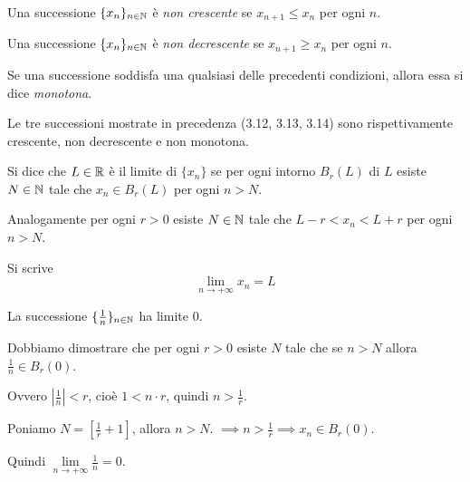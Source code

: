 \begin{definition}
Una successione $\{x_n\}_{n \in \mathbb N}$ è \emph{non crescente} se $x_{n+1} \le x_n$ per ogni $n$.
\end{definition}

\begin{definition}
Una successione $\{x_n\}_{n \in \mathbb N}$ è \emph{non decrescente} se $x_{n+1} \ge x_n$ per ogni $n$.
\end{definition}

Se una successione soddisfa una qualsiasi delle precedenti condizioni, allora essa si dice \emph{monotona}.

\begin{example}
Le tre successioni mostrate in precedenza (3.12, 3.13, 3.14) sono rispettivamente crescente, non decrescente e non monotona.
\end{example}

\begin{definition}
Si dice che $L \in \mathbb R$ è il limite di $\{ x_n \}$ se per ogni intorno $B_r(L)$ di $L$ esiste $N \in \mathbb N$ tale che $x_n \in B_r(L)$ per ogni $n > N$.

Analogamente per ogni $r > 0$ esiste $N \in \mathbb N$ tale che $L-r < x_n < L+r$ per ogni $n > N$.

Si scrive
\begin{equation*}
\lim_{n \to +\infty}{x_n} = L
\end{equation*}
\end{definition}

\begin{example}
La successione $\{\frac{1}{n}\}_{n \in \mathbb N}$ ha limite 0.

Dobbiamo dimostrare che per ogni $r > 0$ esiste $N$ tale che se $n > N$ allora $\frac{1}{n} \in B_r(0)$.

Ovvero $|\frac{1}{n}| < r$, cioè $1 < n \cdot r$, quindi $n > \frac{1}{r}$.

Poniamo $N = [\frac{1}{r} + 1]$, allora $n > N$. $\implies n > \frac{1}{r} \implies x_n \in B_r(0)$. 

Quindi $\lim\limits_{n \to +\infty} \frac{1}{n} = 0$.
\end{example}